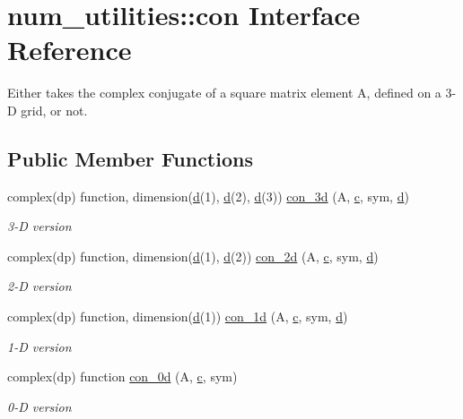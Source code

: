 \hypertarget{interfacenum__utilities_1_1con}{}\section{num\+\_\+utilities\+:\+:con Interface Reference}
\label{interfacenum__utilities_1_1con}


Either takes the complex conjugate of a square matrix element A, defined on a 3-\/D grid, or not.  


\subsection*{Public Member Functions}
\begin{DoxyCompactItemize}
\item 
complex(dp) function, dimension(\hyperlink{namespacenum__utilities_a763215553acfcc054b1ec1bc207a1793}{d}(1), \hyperlink{namespacenum__utilities_a763215553acfcc054b1ec1bc207a1793}{d}(2), \hyperlink{namespacenum__utilities_a763215553acfcc054b1ec1bc207a1793}{d}(3)) \hyperlink{interfacenum__utilities_1_1con_ad7dc647be388d235a1da89b11209e6e3}{con\+\_\+3d} (A, \hyperlink{namespacenum__utilities_a5ee3fbd1fe67d0deefc7194631389f2a}{c}, sym, \hyperlink{namespacenum__utilities_a763215553acfcc054b1ec1bc207a1793}{d})
\begin{DoxyCompactList}\small\item\em 3-\/D version \end{DoxyCompactList}\item 
complex(dp) function, dimension(\hyperlink{namespacenum__utilities_a763215553acfcc054b1ec1bc207a1793}{d}(1), \hyperlink{namespacenum__utilities_a763215553acfcc054b1ec1bc207a1793}{d}(2)) \hyperlink{interfacenum__utilities_1_1con_a2125c4aad81e7b9fa8d7ad58322b5017}{con\+\_\+2d} (A, \hyperlink{namespacenum__utilities_a5ee3fbd1fe67d0deefc7194631389f2a}{c}, sym, \hyperlink{namespacenum__utilities_a763215553acfcc054b1ec1bc207a1793}{d})
\begin{DoxyCompactList}\small\item\em 2-\/D version \end{DoxyCompactList}\item 
complex(dp) function, dimension(\hyperlink{namespacenum__utilities_a763215553acfcc054b1ec1bc207a1793}{d}(1)) \hyperlink{interfacenum__utilities_1_1con_a003fd508b6e473a2f3af1ae01c260fed}{con\+\_\+1d} (A, \hyperlink{namespacenum__utilities_a5ee3fbd1fe67d0deefc7194631389f2a}{c}, sym, \hyperlink{namespacenum__utilities_a763215553acfcc054b1ec1bc207a1793}{d})
\begin{DoxyCompactList}\small\item\em 1-\/D version \end{DoxyCompactList}\item 
complex(dp) function \hyperlink{interfacenum__utilities_1_1con_aeecc12184a4f087ebadfe3d09b0a8b2f}{con\+\_\+0d} (A, \hyperlink{namespacenum__utilities_a5ee3fbd1fe67d0deefc7194631389f2a}{c}, sym)
\begin{DoxyCompactList}\small\item\em 0-\/D version \end{DoxyCompactList}\end{DoxyCompactItemize}


